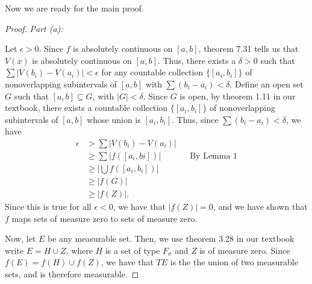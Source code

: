 \documentclass[10pt,a4paper]{article}
\makeatletter
\theoremstyle{theorem}
\newcommand{\proofpart}[2]{%
  \par
  \addvspace{\medskipamount}%
  \noindent\emph{Part #1: #2}\par\nobreak
  \addvspace{\smallskipamount}%
  \@afterheading
}
\theoremstyle{definition}
\makeatother
\begin{document}
Now we are ready for the main proof.
\begin{proof}
\proofpart{(a)}{} Let $\epsilon >0$. Since $f$ is absolutely continuous on $[a, b]$, theorem 7.31 tells us that $V(x)$ is absolutely continuous on $[a, b]$. Thus, there exists a $\delta > 0$ such that $\sum |V(b_i) - V(a_i)| < \epsilon$ for any countable collection $\{[a_i, b_i]\}$ of nonoverlapping subintervals of $[a, b]$ with $\sum (b_i - a_i) < \delta$. Define an open set $G$ such that $[a, b] \subseteq G$, with $|G| < \delta$. Since $G$ is open, by theorem 1.11 in our textbook, there exists a countable collection $\{[a_i, b_i]\}$ of nonoverlapping subintervals of $[a, b]$ whose union is $[a_i, b_i]$. Thus, since $\sum (b_i - a_i) < \delta$, we have
\begin{align*}
\epsilon &> \sum |V(b_i) - V(a_i)|\\
&\geq \sum |f([a_i, bi])| && \text{By Lemma 1}\\
&\geq \left|\bigcup f([a_i, b_i]) \right|\\
&\geq |f(G)|\\
&\geq |f(Z)|.
\end{align*}
Since this is true for all $\epsilon < 0$, we have that $|f(Z)| = 0$, and we have shown that $f$ maps sets of measure zero to sets of measure zero.

Now, let $E$ be any measurable set. Then, we use theorem 3.28 in our textbook write $E = H \cup Z$, where $H$ is a set of type $F_\sigma$ and $Z$ is of measure zero. Since $f(E) = f(H) \cup f(Z)$, we have that $TE$ is the the union of two measurable sets, and is therefore measurable.
\end{proof}
\end{document}
